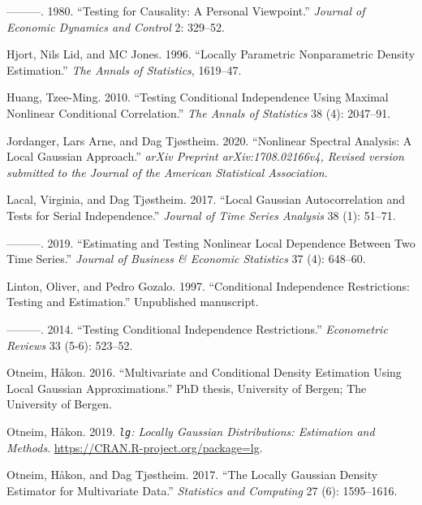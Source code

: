 \documentclass[
  12pt,
  letterpaper]{article}
\newlength{\cslhangindent}
\newenvironment{cslreferences}%
  {\setlength{\parindent}{0pt}%
  \everypar{\setlength{\hangindent}{\cslhangindent}}\ignorespaces}%
  {\par}
\theoremstyle{definition}
\theoremstyle{definition}
\theoremstyle{definition}
\theoremstyle{remark}
\begin{document}
\begin{cslreferences}
\leavevmode\hypertarget{ref-granger1980testing}{}%
---------. 1980. ``Testing for Causality: A Personal Viewpoint.'' \emph{Journal of Economic Dynamics and Control} 2: 329--52.

\leavevmode\hypertarget{ref-hjort1996locally}{}%
Hjort, Nils Lid, and MC Jones. 1996. ``Locally Parametric Nonparametric Density Estimation.'' \emph{The Annals of Statistics}, 1619--47.

\leavevmode\hypertarget{ref-huang2010testing}{}%
Huang, Tzee-Ming. 2010. ``Testing Conditional Independence Using Maximal Nonlinear Conditional Correlation.'' \emph{The Annals of Statistics} 38 (4): 2047--91.

\leavevmode\hypertarget{ref-jordanger2017nonlinear}{}%
Jordanger, Lars Arne, and Dag Tjøstheim. 2020. ``Nonlinear Spectral Analysis: A Local Gaussian Approach.'' \emph{arXiv Preprint arXiv:1708.02166v4, Revised version submitted to the Journal of the American Statistical Association}.

\leavevmode\hypertarget{ref-lacal2017local}{}%
Lacal, Virginia, and Dag Tjøstheim. 2017. ``Local Gaussian Autocorrelation and Tests for Serial Independence.'' \emph{Journal of Time Series Analysis} 38 (1): 51--71.

\leavevmode\hypertarget{ref-lacal2018estimating}{}%
---------. 2019. ``Estimating and Testing Nonlinear Local Dependence Between Two Time Series.'' \emph{Journal of Business \& Economic Statistics} 37 (4): 648--60.

\leavevmode\hypertarget{ref-linton1997conditional}{}%
Linton, Oliver, and Pedro Gozalo. 1997. ``Conditional Independence Restrictions: Testing and Estimation.'' Unpublished manuscript.

\leavevmode\hypertarget{ref-linton2014testing}{}%
---------. 2014. ``Testing Conditional Independence Restrictions.'' \emph{Econometric Reviews} 33 (5-6): 523--52.

\leavevmode\hypertarget{ref-otneim2016multivariate}{}%
Otneim, Håkon. 2016. ``Multivariate and Conditional Density Estimation Using Local Gaussian Approximations.'' PhD thesis, University of Bergen; The University of Bergen.

\leavevmode\hypertarget{ref-otneim2019lg}{}%
Otneim, Håkon. 2019. \emph{\texttt{lg}: Locally Gaussian Distributions: Estimation and Methods}. \url{https://CRAN.R-project.org/package=lg}.

\leavevmode\hypertarget{ref-otneim2017locally}{}%
Otneim, Håkon, and Dag Tjøstheim. 2017. ``The Locally Gaussian Density Estimator for Multivariate Data.'' \emph{Statistics and Computing} 27 (6): 1595--1616.


\end{cslreferences}
\end{document}

